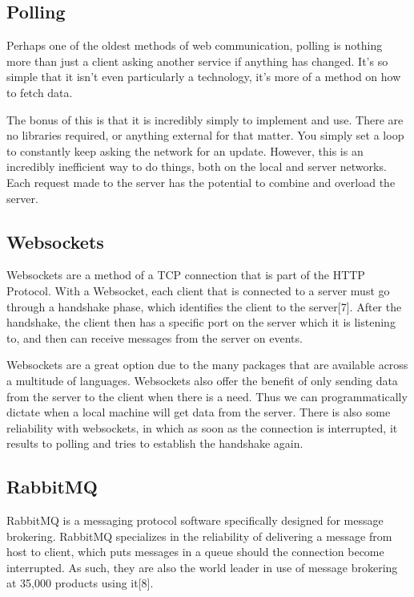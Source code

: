 \documentclass[onecolumn, draftclsnofoot,10pt, compsoc]{IEEEtran}
\begin{document}
    \subsection{Polling}
       Perhaps one of the oldest methods of web communication, polling is nothing more than just a client asking another service if anything has changed. It’s so simple that it isn’t even particularly a technology, it’s more of a method on how to fetch data. 

        The bonus of this is that it is incredibly simply to implement and use. There are no libraries required, or anything external for that matter. You simply set a loop to constantly keep asking the network for an update. However, this is an incredibly inefficient way to do things, both on the local and server networks. Each request made to the server has the potential to combine and overload the server.

    \subsection{Websockets}
        Websockets are a method of a TCP connection that is part of the HTTP Protocol. With a Websocket, each client that is connected to a server must go through a handshake phase, which identifies the client to the server[7]. After the handshake, the client then has a specific port on the server which it is listening to, and then can receive messages from the server on events. 

        Websockets are a great option due to the many packages that are available across a multitude of languages. Websockets also offer the benefit of only sending data from the server to the client when there is a need. Thus we can programmatically dictate when a local machine will get data from the server. There is also some reliability with websockets, in which as soon as the connection is interrupted, it results to polling and tries to establish the handshake again.

    \subsection{RabbitMQ}
        RabbitMQ is a messaging protocol software specifically designed for message brokering. RabbitMQ specializes in the reliability of delivering a message from host to client, which puts messages in a queue should the connection become interrupted. As such, they are also the world leader in use of message brokering at 35,000 products using it[8]. 
\end{document}
